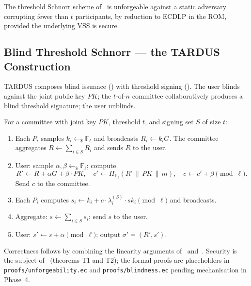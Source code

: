 \begin{theorem}
\label{thm:threshold-euf}
The threshold Schnorr scheme of~ is unforgeable against a static adversary corrupting fewer than $t$ participants, by reduction to ECDLP in the ROM, provided the underlying VSS is secure.
\end{theorem}

\subsection{Blind Threshold Schnorr --- the TARDUS Construction}
\label{sec:blind-threshold}

TARDUS composes blind issuance () with threshold signing (). The user blinds against the joint public key $PK$; the $t$-of-$n$ committee collaboratively produces a blind threshold signature; the user unblinds.

\begin{construction}
\label{con:blind-threshold}
For a committee with joint key $PK$, threshold $t$, and signing set $S$ of size $t$:
\begin{enumerate}[leftmargin=2em,itemsep=0.2em]
  \item Each $P_i$ samples $k_i \leftarrow_\$ \mathbb{F}_\ell$ and broadcasts $R_i \gets k_i G$. The committee aggregates $R \gets \sum_{i \in S} R_i$ and sends $R$ to the user.
  \item User: sample $\alpha, \beta \leftarrow_\$ \mathbb{F}_\ell$; compute
    \[
      R' \gets R + \alpha G + \beta \cdot PK, \quad
      c' \gets H_{\mathbb{F}_\ell}(R' \,\|\, PK \,\|\, m), \quad
      c \gets c' + \beta \pmod{\ell}.
    \]
    Send $c$ to the committee.
  \item Each $P_i$ computes $s_i \gets k_i + c \cdot \lambda_i^{(S)} \cdot sk_i \pmod{\ell}$ and broadcasts.
  \item Aggregate: $s \gets \sum_{i \in S} s_i$; send $s$ to the user.
  \item User: $s' \gets s + \alpha \pmod{\ell}$; output $\sigma' = (R', s')$.
\end{enumerate}
\end{construction}

Correctness follows by combining the linearity arguments of~ and~. Security is the subject of~ (theorems T1 and T2); the formal proofs are placeholders in \texttt{proofs/unforgeability.ec} and \texttt{proofs/blindness.ec} pending mechanisation in Phase~4.

